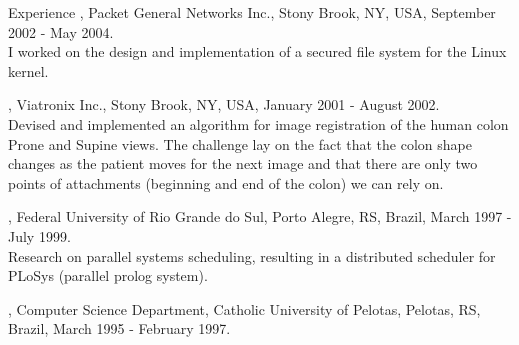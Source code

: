 \documentclass[10pt]{resume}
\begin{document}
\begin{category}{Experience}
  , Packet General Networks Inc., Stony Brook, NY, USA,
  September 2002 - May 2004.\\
  I worked on the design and implementation of a secured file system
  for the Linux kernel.
  
  , Viatronix Inc., Stony Brook, NY, USA, January 2001
  - August 2002.\\
  Devised and implemented an algorithm for image registration of the human 
  colon Prone and Supine views. The challenge lay on the fact that the colon
  shape changes as the patient moves for the next image and that there are
  only two points of attachments (beginning and end of the colon) we can
  rely on.

  , Federal University of Rio Grande do
  Sul, Porto Alegre, RS, Brazil, March 1997 - July 1999.\\
  Research on parallel systems scheduling, resulting in a distributed
  scheduler for PLoSys (parallel prolog system).

  , Computer Science Department, Catholic
  University of Pelotas, Pelotas, RS, Brazil, March 1995 - February 1997.

\end{category}
\end{document}

